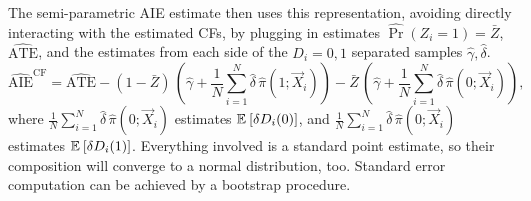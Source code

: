 The semi-parametric AIE estimate then uses this representation, avoiding directly interacting with the estimated CFs, by plugging in estimates $\hat{\Pr}(Z_i = 1) = \bar Z$, $\hat{\text{ATE}}$, and the estimates from each side of the $D_i =0,1$ separated samples $\hat\gamma, \hat\delta$.
\[ \hat{\text{AIE}}^{\text{CF}}
    = \hat{\text{ATE}}
    - (1 - \bar Z) \, \left( \hat\gamma +
        \frac 1N \sum_{i = 1}^N \hat \delta \, \hat\pi(1; \vec X_i) \right)
    - \bar Z \, \left(\hat\gamma +
        \frac 1N \sum_{i = 1}^N \hat \delta \, \hat\pi(0; \vec X_i)  \right), \]
where $\frac 1N \sum_{i = 1}^N \hat \delta \, \hat\pi(0; \vec X_i)$ estimates $\mathbb{E}_{} \left[ \delta D_i(0) \right]$, and $\frac 1N \sum_{i = 1}^N \hat \delta \, \hat\pi(0; \vec X_i)$ estimates $\mathbb{E}_{} \left[ \delta D_i(1) \right]$.
Everything involved is a standard point estimate, so their composition will converge to a normal distribution, too.
Standard error computation can be achieved by a bootstrap procedure.


